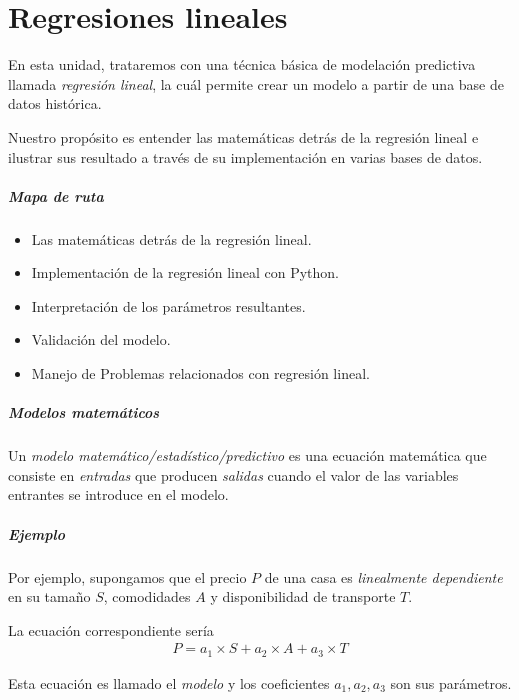 \chapter{Regresiones lineales}

En esta unidad, trataremos con una técnica básica de modelación predictiva llamada \emph{regresión lineal}, la cuál permite crear un modelo a partir de una base de datos histórica.


Nuestro propósito es entender las matemáticas detrás de la regresión lineal e ilustrar sus resultado a través de su implementación en varias bases de datos.

\paragraph{Mapa de ruta}
\begin{itemize}
 \item Las matemáticas detrás de la regresión lineal.
 \item Implementación de la regresión lineal con Python.
 \item Interpretación de los parámetros resultantes.
 \item Validación del modelo.
 \item Manejo de Problemas relacionados con regresión lineal.
\end{itemize}


\paragraph{Modelos matemáticos}
Un \emph{modelo matemático/estadístico/predictivo} es una ecuación matemática que consiste en \emph{entradas} que producen \emph{salidas} cuando el valor de las variables entrantes se introduce en el modelo.

\paragraph{Ejemplo}
Por ejemplo, supongamos que el precio $P$ de una casa es \emph{linealmente dependiente} en su tamaño $S$, comodidades $A$ y disponibilidad de transporte $T$.



La ecuación correspondiente sería
\begin{align}
 P = a_{1}\times S+ a_{2} \times A + a_{3} \times T
\end{align}



Esta ecuación es llamado el \emph{modelo} y los coeficientes $a_{1},a_{2},a_{3}$ son sus parámetros.



